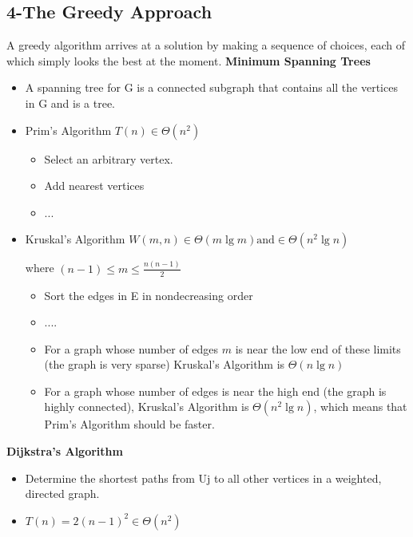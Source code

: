 \documentclass{../cheat}
\begin{document}
\begin{multicols}{3}
\section{4-The Greedy Approach}
	A greedy algorithm arrives at a solution by making a sequence of choices, each of which simply looks the best at the moment. 
	\textbf{Minimum Spanning Trees}
	\begin{itemize}
		\item A spanning tree for G is a connected subgraph that contains all the vertices in G and is a tree.
		\item Prim's Algorithm $T(n) \in \Theta(n^2)$
			\begin{itemize}
				\item Select an arbitrary vertex. 
				\item Add nearest vertices
				\item ...
			\end{itemize}
		\item Kruskal's Algorithm $W(m,n) \in \Theta(m\; \text{lg} \; m) \text{and} \in \Theta(n^2\; \text{lg} \; n)$\\
		\centerline{where \quad $(n - 1) \leq m \leq \frac{n(n - 1)}{2}$}
		\begin{itemize}
			\item Sort the edges in E in nondecreasing order
			\item ....
			\item For a graph whose number of edges $m$ is near the low end of these limits (the graph is very sparse) Kruskal's Algorithm is $\Theta(n\; \text{lg} \; n)$
			\item For a graph whose number of edges is near the high end (the graph is highly connected), Kruskal's Algorithm is $ \Theta(n^2\; \text{lg} \; n)$, which means that Prim's Algorithm should be faster. 
		\end{itemize}

	\end{itemize}
	 

	\textbf{Dijkstra's Algorithm}
	\begin{itemize}
		\item Determine the shortest paths from Uj to all other vertices in a weighted, directed graph. 
		\item $T(n) = 2(n - 1)^2 \in \Theta(n^2)$	
	\end{itemize}



\end{multicols}
\end{document}
